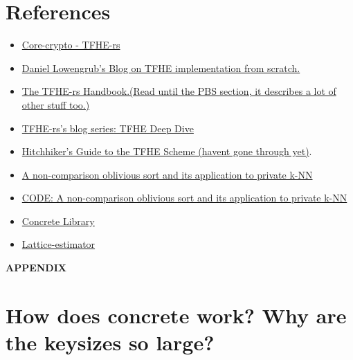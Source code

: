 \documentclass{report}
\begin{document}
\chapter{References}
\begin{itemize}
  \item \href{https://docs.zama.org/tfhe-rs/references/core-crypto-api/tutorial}{Core-crypto - TFHE-rs}
  \item \href{https://www.daniellowengrub.com/blog/2024/01/03/fully-homomorphic-encryption}{Daniel Lowengrub's Blog on TFHE implementation from scratch.} \label{ref:blog}
  \item \href{https://github.com/zama-ai/tfhe-rs-handbook}{The TFHE-rs Handbook.(Read until the PBS section, it describes a lot of other stuff too.)} \label{ref:handbook}
   \item \href{https://docs.zama.org/tfhe-rs/explanations/tfhe-deep-dive}{TFHE-rs's blog series: TFHE Deep Dive}
   \item \href{https://hal.science/hal-04121360/document}{Hitchhiker's Guide to the TFHE Scheme (havent gone through yet)}.
   \item \href{https://eprint.iacr.org/2024/1894.pdf}{A non-comparison oblivious sort and its application to private k-NN} \label{ref:paper_comp_sort}
   \item \href{https://github.com/sofianeazogagh/revoLUT}{CODE: A non-comparison oblivious sort and its application to private k-NN} \label{ref:paper_comp_sort-code}
   \item \href{https://docs.zama.org/concrete}{Concrete Library} \label{ref:concrete-library}
   \item \href{https://github.com/malb/lattice-estimator}{Lattice-estimator} \label{ref:lattice-estimator}
\end{itemize}

\clearpage
\begin{center}
	\vspace*{\fill}
	{\huge \textbf{APPENDIX}}
	\vspace*{\fill}
\end{center}
\clearpage

\chapter{How does concrete work? Why are the keysizes so large?}
\end{document}
